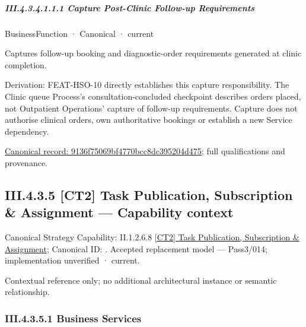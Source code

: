 \subparagraph*{III.4.3.4.1.1.1 Capture Post-Clinic Follow-up Requirements}
\label{navigation:III.4.3.4.1.1.1}

\label{element:9136f75069bf4770bcc8dc395204d475}
{\small BusinessFunction · Canonical · current}\par

Captures follow-up booking and diagnostic-order requirements generated at clinic completion.



Derivation: FEAT-HSO-10 directly establishes this capture responsibility. The Clinic queue Process's consultation-concluded checkpoint describes orders placed, not Outpatient Operations' capture of follow-up requirements. Capture does not authorise clinical orders, own authoritative bookings or establish a new Service dependency.


{\footnotesize \href{../../../../continuum/business/business-function/9136f75069bf4770bcc8dc395204d475.md}{Canonical record: 9136f75069bf4770bcc8dc395204d475}; full qualifications and provenance.}\par
\subsection*{III.4.3.5 [CT2] Task Publication, Subscription \& Assignment — Capability context}
\label{navigation:III.4.3.5}

{\small Canonical Strategy Capability: II.1.2.6.8 \hyperref[element:f41e5bfc2b5845bbbb3290ecf8b57892]{[CT2] Task Publication, Subscription \& Assignment}; Canonical ID: \texttt{}. Accepted replacement model — Pass3/014; implementation unverified · current.}\par
Contextual reference only; no additional architectural instance or semantic relationship.\par
\subsubsection*{III.4.3.5.1 Business Services}
\label{navigation:III.4.3.5.1}


